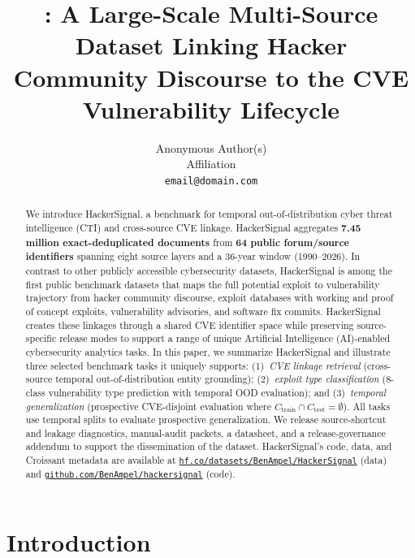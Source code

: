 \documentclass{article}
\title{\etg: A Large-Scale Multi-Source Dataset Linking Hacker Community
       Discourse to the CVE Vulnerability Lifecycle}
\author{%
  Anonymous Author(s) \\
  Affiliation \\
  \texttt{email@domain.com}
}
\begin{document}
\maketitle

\begin{abstract}

We introduce HackerSignal, a benchmark for temporal out-of-distribution cyber threat intelligence (CTI) and cross-source CVE linkage. HackerSignal aggregates \textbf{7.45 million exact-deduplicated documents} from \textbf{64 public forum/source identifiers} spanning eight source layers and a 36-year window (1990--2026). In contrast to other publicly accessible cybersecurity datasets, HackerSignal is among the first public benchmark datasets that maps the full potential exploit to vulnerability trajectory from hacker community discourse, exploit databases with working and proof of concept exploits, vulnerability advisories, and software fix commits. HackerSignal creates these linkages through a shared CVE identifier space while preserving source-specific release modes to support a range of unique Artificial Intelligence (AI)-enabled cybersecurity analytics tasks. In this paper, we summarize HackerSignal and illustrate three selected benchmark tasks it uniquely supports: (1)~\emph{CVE linkage retrieval} (cross-source temporal out-of-distribution entity grounding); (2)~\emph{exploit type classification} (8-class vulnerability type prediction with temporal OOD evaluation); and (3)~\emph{temporal generalization} (prospective CVE-disjoint evaluation where $C_{\text{train}} \cap C_{\text{test}} = \emptyset$). All tasks use temporal splits to evaluate prospective generalization. We release source-shortcut and leakage diagnostics, manual-audit packets, a datasheet, and a release-governance addendum to support the dissemination of the dataset. HackerSignal's code, data, and Croissant metadata are available at \href{https://huggingface.co/datasets/BenAmpel/HackerSignal}{\texttt{hf.co/datasets/BenAmpel/HackerSignal}} (data) and \href{https://github.com/BenAmpel/hackersignal}{\texttt{github.com/BenAmpel/hackersignal}} (code).
\end{abstract}

\section{Introduction}
\end{document}
